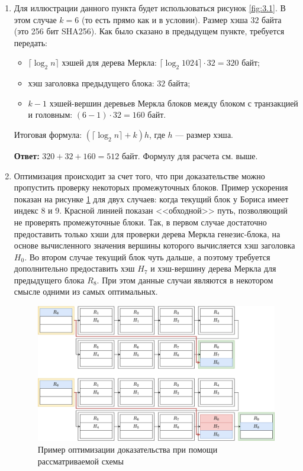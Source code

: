 \documentclass[12pt, a4paper]{extarticle}
\newcommand{\Answer}[1]{\textbf{Ответ:} #1}
\begin{document}
\begin{enumerate}
    \item Для иллюстрации данного пункта будет использоваться рисунок \ref{fig:3.1}. В этом случае $k = 6$
        (то есть прямо как и в условии). Размер хэша $32$ байта (это 256 бит SHA256). Как было сказано
        в предыдущем пункте, требуется передать:
        \begin{itemize}
            \item $\lceil \log_2 n \rceil$ хэшей для дерева Меркла: $\lceil \log_2 1024 \rceil \cdot 
                32 = 320$ байт;
            \item хэш заголовка предыдущего блока: $32$ байта;
            \item $k - 1$ хэшей-вершин деревьев Меркла блоков между блоком с транзакцией и головным:
                $(6 - 1) \cdot 32 = 160$ байт.
        \end{itemize}
        
        Итоговая формула: $\left(\lceil \log_2 n \rceil + k\right) h$, где $h$ --- размер хэша.
        
        \Answer{$320 + 32 + 160 = 512$ байт. Формулу для расчета см. выше.}
    
    \item Оптимизация происходит за счет того, что при доказательстве можно пропустить проверку
        некоторых промежуточных блоков. Пример ускорения показан на рисунке \ref{fig:3.3} для двух
        случаев: когда текущий блок у Бориса имеет индекс 8 и 9. Красной линией показан <<обходной>>
        путь, позволяющий не проверять промежуточные блоки. Так, в первом случае достаточно предоставить
        только хэши для проверки дерева Меркла генезис-блока, на основе вычисленного значения вершины
        которого вычисляется хэш заголовка $H_0$. Во втором случае текущий блок чуть дальше, а поэтому
        требуется дополнительно предоставить хэш $H_7$ и хэш-вершину дерева Меркла для предыдущего 
        блока $R_8$. При этом данные случаи являются в некотором смысле одними из самых оптимальных.
        \begin{figure}[h!]
            \centering
            \includegraphics[width=\textwidth]{3.3.png}
            \caption{Пример оптимизации доказательства при помощи рассматриваемой схемы}
            \label{fig:3.3}
        \end{figure}
        

\end{enumerate}
\end{document}
